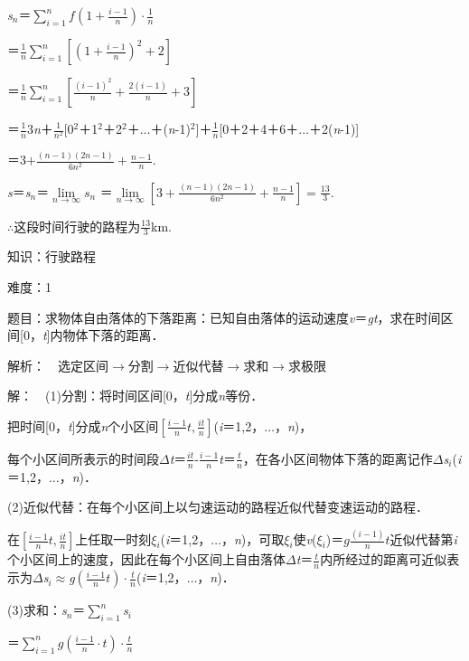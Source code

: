 \documentclass{article} %
\begin{document}
\textit{s${}_{n}$}＝$\sum\limits_{i=1}^nf(1+\frac{i-1}{n})\cdot\frac{1}{n}$

＝$\frac{1}{n}\sum\limits_{i=1}^n[(1+\frac{i-1}{n})^2+2]$

＝$\frac{1}{n}\sum\limits_{i=1}^n[\frac{(i-1)^2}{n}+\frac{2(i-1)}{n}+3]$

＝$\frac{1}{n}$3\textit{n}＋$\frac{1}{n^2}$[0${}^{2}$＋1${}^{2}$＋2${}^{2}$＋{$\dots$}＋(\textit{n}-1)${}^{2}$]＋$\frac{1}{n}$[0＋2＋4＋6＋{$\dots$}＋2(\textit{n}-1)]

＝3$+\frac{(n-1)(2n-1)}{6n^2}+\frac{n-1}{n}$.

\textit{s}＝\textit{s${}_{n}$}＝$\lim\limits_{n\rightarrow \infty} s_n$ ＝$\lim\limits_{n\rightarrow \infty}[3+\frac{(n-1)(2n-1)}{6n^2}+\frac{n-1}{n}]=\frac{13}{3}$.

$\mathrm{\therefore}$这段时间行驶的路程为$\frac{13}{3}$km.



 知识：行驶路程

 难度：1

 题目：求物体自由落体的下落距离：已知自由落体的运动速度\textit{v}＝\textit{gt}，求在时间区间[0，\textit{t}]内物体下落的距离．

 解析：　选定区间$\mathrm{\to}$分割$\mathrm{\to}$近似代替$\mathrm{\to}$求和$\mathrm{\to}$求极限

 解：　(1)分割：将时间区间[0，\textit{t}]分成\textit{n}等份．

把时间[0，\textit{t}]分成\textit{n}个小区间$[\frac{i-1}{n}t, \frac{it}{n}]$(\textit{i}＝1,2，{$\dots$}，\textit{n})，

每个小区间所表示的时间段$\Delta$\textit{t}＝$\frac{it}{n}$-$\frac{i-1}{n}$\textit{t}＝$\frac{t}{n}$，在各小区间物体下落的距离记作$\Delta$\textit{s${}_{i}$}(\textit{i}＝1,2，{$\dots$}，\textit{n})．

(2)近似代替：在每个小区间上以匀速运动的路程近似代替变速运动的路程．

在$[\frac{i-1}{n}t, \frac{it}{n}]$上任取一时刻\textit{$\xi$${}_{i}$}(\textit{i}＝1,2，{$\dots$}，\textit{n})，可取\textit{$\xi$${}_{i}$}使\textit{v}(\textit{$\xi$${}_{i}$})＝$g\frac{(i-1)}{n}t$近似代替第\textit{i}个小区间上的速度，因此在每个小区间上自由落体$\Delta$\textit{t}＝$\frac{t}{n}$内所经过的距离可近似表示为$\Delta$\textit{s${}_{i}$}$\mathrm{\approx}$\textit{g}$(\frac{i-1}{n}t)\cdot\frac{t}{n}$(\textit{i}＝1,2，{$\dots$}，\textit{n})．

(3)求和：\textit{s${}_{n}$}＝$\sum\limits_{i=1}^n$\textit{s${}_{i}$}

＝$\sum\limits_{i=1}^ng(\frac{i-1}{n}\cdot t)\cdot\frac{t}{n}$
\end{document}
